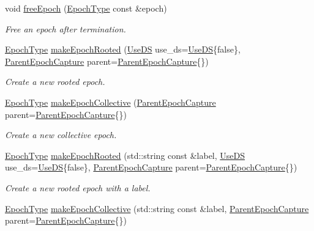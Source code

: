 \begin{DoxyCompactItemize}
void \hyperlink{structvt_1_1term_1_1_termination_detector_a3b1e4a0d87c5af08fc36925ec74504fd}{free\+Epoch} (\hyperlink{namespacevt_a81d11b28122d43bf9834577e4a06440f}{Epoch\+Type} const \&epoch)
\begin{DoxyCompactList}\small\item\em Free an epoch after termination. \end{DoxyCompactList}\item 
\hyperlink{namespacevt_a81d11b28122d43bf9834577e4a06440f}{Epoch\+Type} \hyperlink{structvt_1_1term_1_1_termination_detector_ae4df2a2e947665cc89971a61de787a98}{make\+Epoch\+Rooted} (\hyperlink{structvt_1_1term_1_1_use_d_s}{Use\+DS} use\+\_\+ds=\hyperlink{structvt_1_1term_1_1_use_d_s}{Use\+DS}\{false\}, \hyperlink{structvt_1_1term_1_1_parent_epoch_capture}{Parent\+Epoch\+Capture} parent=\hyperlink{structvt_1_1term_1_1_parent_epoch_capture}{Parent\+Epoch\+Capture}\{\})
\begin{DoxyCompactList}\small\item\em Create a new rooted epoch. \end{DoxyCompactList}\item 
\hyperlink{namespacevt_a81d11b28122d43bf9834577e4a06440f}{Epoch\+Type} \hyperlink{structvt_1_1term_1_1_termination_detector_aeba62165ec8dfbc445e3631ff295f159}{make\+Epoch\+Collective} (\hyperlink{structvt_1_1term_1_1_parent_epoch_capture}{Parent\+Epoch\+Capture} parent=\hyperlink{structvt_1_1term_1_1_parent_epoch_capture}{Parent\+Epoch\+Capture}\{\})
\begin{DoxyCompactList}\small\item\em Create a new collective epoch. \end{DoxyCompactList}\item 
\hyperlink{namespacevt_a81d11b28122d43bf9834577e4a06440f}{Epoch\+Type} \hyperlink{structvt_1_1term_1_1_termination_detector_ac7e27dfc37a7a4cb1e1538f4f9eac4c6}{make\+Epoch\+Rooted} (std\+::string const \&label, \hyperlink{structvt_1_1term_1_1_use_d_s}{Use\+DS} use\+\_\+ds=\hyperlink{structvt_1_1term_1_1_use_d_s}{Use\+DS}\{false\}, \hyperlink{structvt_1_1term_1_1_parent_epoch_capture}{Parent\+Epoch\+Capture} parent=\hyperlink{structvt_1_1term_1_1_parent_epoch_capture}{Parent\+Epoch\+Capture}\{\})
\begin{DoxyCompactList}\small\item\em Create a new rooted epoch with a label. \end{DoxyCompactList}\item 
\hyperlink{namespacevt_a81d11b28122d43bf9834577e4a06440f}{Epoch\+Type} \hyperlink{structvt_1_1term_1_1_termination_detector_a9da0ae37a148a0f6db83488cd44c19cb}{make\+Epoch\+Collective} (std\+::string const \&label, \hyperlink{structvt_1_1term_1_1_parent_epoch_capture}{Parent\+Epoch\+Capture} parent=\hyperlink{structvt_1_1term_1_1_parent_epoch_capture}{Parent\+Epoch\+Capture}\{\})

\end{DoxyCompactItemize}
